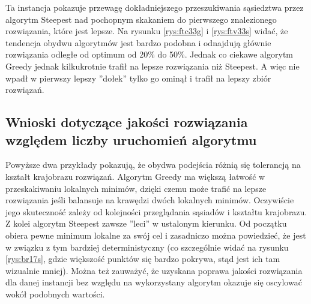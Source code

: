 Ta instancja pokazuje przewagę dokładniejszego przeszukiwania sąsiedztwa przez algorytm Steepest nad pochopnym skakaniem do pierwszego znalezionego rozwiązania, które jest lepsze. Na rysunku \ref{rys:ftc33g} i \ref{rys:ftv33s} widać, że tendencja obydwu algorytmów jest bardzo podobna i odnajdują głównie rozwiązania odległe od optimum od 20\% do 50\%. Jednak co ciekawe algorytm Greedy jednak kilkukrotnie trafił na lepsze rozwiązania niż Steepest. A więc nie wpadł w pierwszy lepszy ''dołek'' tylko go ominął i trafił na lepszy zbiór rozwiązań.

\subsection{Wnioski dotyczące jakości rozwiązania względem liczby uruchomień algorytmu}
Powyższe dwa przykłady pokazują, że obydwa podejścia różnią się tolerancją na kształt krajobrazu rozwiązań. Algorytm Greedy ma większą łatwość w przeskakiwaniu lokalnych minimów, dzięki czemu może trafić na lepsze rozwiązania jeśli balansuje na krawędzi dwóch lokalnych minimów. Oczywiście jego skuteczność zależy od kolejności przeglądania sąsiadów i kształtu krajobrazu. Z kolei algorytm Steepest zawsze ''leci'' w ustalonym kierunku. Od początku obiera pewne minimum lokalne za swój cel i zasadniczo można powiedzieć, że jest w związku z tym bardziej deterministyczny (co szczególnie widać na rysunku \ref{rys:br17s}, gdzie większość punktów się bardzo pokrywa, stąd jest ich tam wizualnie mniej). Można też zauważyć, że uzyskana poprawa jakości rozwiązania dla danej instancji bez względu na wykorzystany algorytm okazuje się oscylować wokół podobnych wartości.
